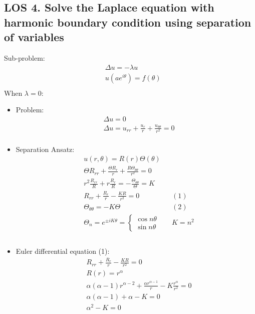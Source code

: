 \documentclass[12pt, a4paper]{article}
\begin{document}
\subsection*{LOS 4. Solve the Laplace equation with harmonic boundary condition using separation of variables}
Sub-problem:
\begin{align*}
    &\Delta u = -\lambda u\\
    &u(ae^{i\theta}) = f(\theta)\\
\end{align*}
When $\lambda = 0$:
\begin{itemize}
    \item Problem:
    \begin{align*}
        &\Delta u =0\\
        &\Delta u = u_{rr}+\frac{u_r}{r}+\frac{u_{\theta\theta}}{r^2}=0\\
    \end{align*}
    \item Separation Ansatz:
    \begin{align*}
        &u(r, \theta) = R(r)\Theta(\theta)\\
        &\Theta R_{rr} + \frac{\Theta R_{r}}{r} + \frac{R\Theta_{\theta\theta}}{r^2} = 0\\
        &r^2\frac{R_{rr}}{R} + r\frac{R_r}{R} = -\frac{\Theta_{\theta\theta}}{\Theta} = K\\
        &R_{rr} + \frac{R_r}{r} - \frac{KR}{r^2} = 0&&(1)\\
        &\Theta_{\theta\theta} = -K\Theta&&(2)\\
        &\Theta_n = e^{\pm iK\theta}= \begin{cases}
            \cos n\theta\\
            \sin n\theta
        \end{cases}&&K = n^2\\\\
    \end{align*}
    \item Euler differential equation (1):
    \begin{align*}
        &R_{rr} + \frac{R_r}{r} - \frac{KR}{r^2} = 0\\
        &R(r) = r^\alpha\\
        &\alpha(\alpha - 1)r^{\alpha - 2} + \frac{\alpha r^{\alpha - 1}}{r} - K \frac{r^\alpha}{r^2} = 0\\
        &\alpha(\alpha - 1) + \alpha - K =0\\
        &\alpha^2 - K = 0\\

\end{align*}
\end{itemize}
\end{document}

